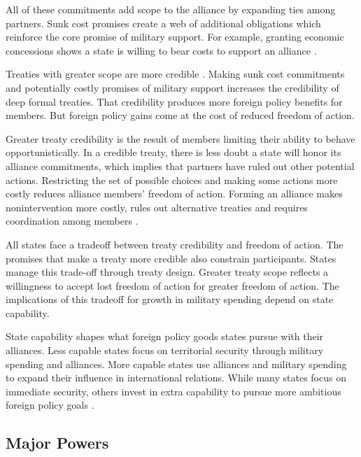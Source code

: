 \documentclass[12pt]{article}
\begin{document}
All of these commitments add scope to the alliance by expanding ties among partners. 
Sunk cost promises create a web of additional obligations which reinforce the core promise of military support.  
For example, granting economic concessions shows a state is willing to bear costs to support an alliance \citep{WolfordKim2017}. 


Treaties with greater scope are more credible \citep{Poast2013}. 
Making sunk cost commitments and potentially costly promises of military support increases the credibility of deep formal treaties.
That credibility produces more foreign policy benefits for members. 
But foreign policy gains come at the cost of reduced freedom of action. 


Greater treaty credibility is the result of members limiting their ability to behave opportunistically. 
In a credible treaty, there is less doubt a state will honor its alliance commitments, which implies that partners have ruled out other potential actions. 
Restricting the set of possible choices and making some actions more costly reduces alliance members' freedom of action. 
Forming an alliance makes nonintervention more costly, rules out alternative treaties and requires coordination among members \citep{Snyder1997}. 


All states face a tradeoff between treaty credibility and freedom of action. 
The promises that make a treaty more credible also constrain participants. 
States manage this trade-off through treaty design. 
Greater treaty scope reflects a willingness to accept lost freedom of action for greater freedom of action. 
The implications of this tradeoff for growth in military spending depend on state capability. 


State capability shapes what foreign policy goods states pursue with their alliances. 
Less capable states focus on territorial security through military spending and alliances. 
More capable states use alliances and military spending to expand their influence in international relations. 
While many states focus on immediate security, others invest in extra capability to pursue more ambitious foreign policy goals \citep{Fordham2011, MarkowitzFariss2017}. 


\subsection{Major Powers} 
\end{document}
